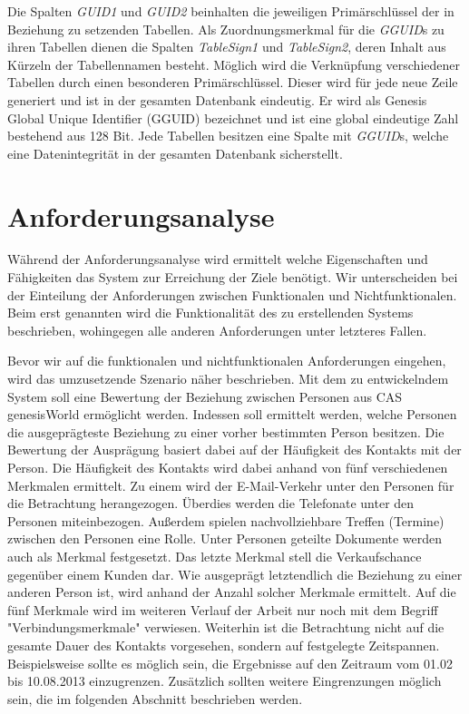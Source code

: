 Die Spalten \textit{GUID1} und \textit{GUID2} beinhalten die jeweiligen Primärschlüssel der in Beziehung zu setzenden Tabellen. Als Zuordnungsmerkmal für die \textit{GGUID}s zu ihren Tabellen dienen die Spalten \textit{TableSign1} und \textit{TableSign2}, deren Inhalt aus Kürzeln der Tabellennamen besteht. Möglich wird die Verknüpfung verschiedener Tabellen durch einen besonderen Primärschlüssel. Dieser wird für jede neue Zeile generiert und ist in der gesamten Datenbank eindeutig. Er wird als Genesis Global Unique Identifier (GGUID) bezeichnet und ist eine global eindeutige Zahl bestehend aus 128 Bit. Jede Tabellen besitzen eine Spalte mit \textit{GGUID}s, welche eine Datenintegrität in der gesamten Datenbank sicherstellt.

\section{Anforderungsanalyse}
\label{ch:Systemanalyse:sec:Anforderungsanalyse}

Während der Anforderungsanalyse wird ermittelt welche Eigenschaften und Fähigkeiten das System zur Erreichung der Ziele benötigt. Wir unterscheiden bei der Einteilung der Anforderungen zwischen Funktionalen und Nichtfunktionalen. Beim erst genannten wird die Funktionalität des zu erstellenden Systems beschrieben, wohingegen alle anderen Anforderungen unter letzteres Fallen. 

Bevor wir auf die funktionalen und nichtfunktionalen Anforderungen eingehen, wird das umzusetzende Szenario näher beschrieben. Mit dem zu entwickelndem System soll eine Bewertung der Beziehung zwischen Personen aus CAS genesisWorld ermöglicht werden. Indessen soll ermittelt werden, welche Personen die ausgeprägteste Beziehung zu einer vorher bestimmten Person besitzen. Die Bewertung der Ausprägung basiert dabei auf der Häufigkeit des Kontakts mit der Person. Die Häufigkeit des Kontakts wird dabei anhand von fünf verschiedenen Merkmalen ermittelt. Zu einem wird der E-Mail-Verkehr unter den Personen für die Betrachtung herangezogen. Überdies werden die Telefonate unter den Personen miteinbezogen. Außerdem spielen nachvollziehbare Treffen (Termine) zwischen den Personen eine Rolle. Unter Personen geteilte Dokumente werden auch als Merkmal festgesetzt. Das letzte Merkmal stell die Verkaufschance gegenüber einem Kunden dar. Wie ausgeprägt letztendlich die Beziehung zu einer anderen Person ist, wird anhand der Anzahl solcher Merkmale ermittelt. Auf die fünf Merkmale wird im weiteren Verlauf der Arbeit nur noch mit dem Begriff "Verbindungsmerkmale" verwiesen. Weiterhin ist die Betrachtung nicht auf die gesamte Dauer des Kontakts vorgesehen, sondern auf festgelegte Zeitspannen. Beispielsweise sollte es möglich sein, die Ergebnisse auf den Zeitraum vom 01.02 bis 10.08.2013 einzugrenzen. Zusätzlich sollten weitere Eingrenzungen möglich sein, die im folgenden Abschnitt beschrieben werden.

